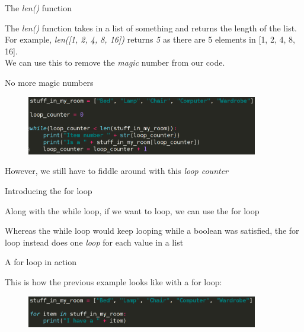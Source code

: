 \documentclass{beamer}
\begin{document}
\begin{frame}{The \textit{len()} function}

The \textit{len()} function takes in a list of something and returns the length of the list.\\ \pause
For example, \textit{len({[}1, 2, 4, 8, 16{]})} returns \textit{5} as there are 5 elements in {[}1, 2, 4, 8, 16{]}.\\ \pause
We can use this to remove the \textit{magic} number from our code.

\end{frame}

\begin{frame}{No more magic numbers}
\begin{figure}[h]
\includegraphics[width=0.9\textwidth]{roomstuff3}
\end{figure}
\pause
However, we still have to fiddle around with this \textit{loop counter}
\end{frame}

\begin{frame}{Introducing the for loop}

Along with the while loop, if we want to loop, we can use the for loop\\ \pause

Whereas the while loop would keep looping while a boolean was satisfied, the for loop instead does one \textit{loop} for each value in a list\\


\end{frame}

\begin{frame}{A for loop in action}

This is how the previous example looks like with a for loop:\\ \pause
\begin{figure}[h]
\includegraphics[width=0.9\textwidth]{roomstuff2}
\end{figure}

\end{frame}
\end{document}
